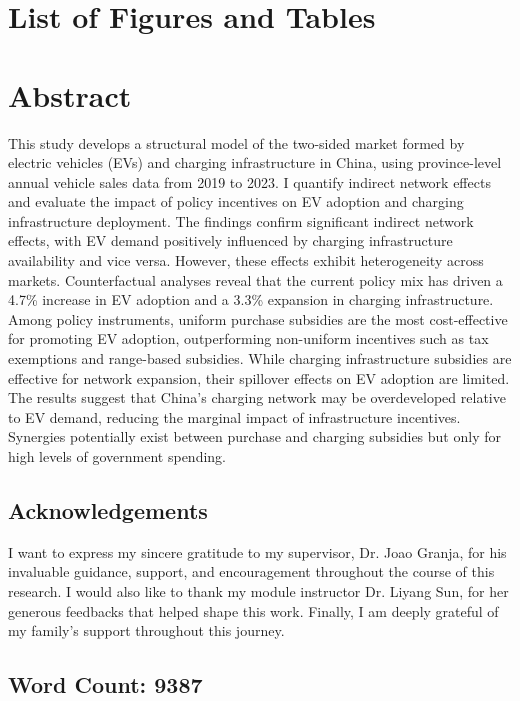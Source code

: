 \documentclass[12pt]{article}
\begin{document}
\section*{List of Figures and Tables}
\listoffigures
\listoftables


\newpage


\section*{Abstract}
This study develops a structural model of the two-sided market formed by electric vehicles (EVs) and charging infrastructure in China, using province-level annual vehicle sales data from 2019 to 2023. 
I quantify indirect network effects and evaluate the impact of policy incentives on EV adoption and charging infrastructure deployment. 
The findings confirm significant indirect network effects, with EV demand positively influenced by charging infrastructure availability and vice versa. 
However, these effects exhibit heterogeneity across markets. Counterfactual analyses reveal that the current policy mix has driven a 4.7\% increase in EV adoption and a 3.3\% expansion in charging infrastructure. 
Among policy instruments, uniform purchase subsidies are the most cost-effective for promoting EV adoption, outperforming non-uniform incentives such as tax exemptions and range-based subsidies. 
While charging infrastructure subsidies are effective for network expansion, their spillover effects on EV adoption are limited. The results suggest that China's charging network may be overdeveloped relative to EV demand, reducing the marginal impact of infrastructure incentives.
Synergies potentially exist between purchase and charging subsidies but only for high levels of government spending.



\subsection*{Acknowledgements}
I want to express my sincere gratitude to my supervisor, Dr. Joao Granja, 
for his invaluable guidance, support, and encouragement throughout the course of this research.
I would also like to thank my module instructor Dr. Liyang Sun, for her generous feedbacks that helped shape this work.
Finally, I am deeply grateful of my family's support throughout this journey.

\subsection*{Word Count: 9387}
\newpage
\end{document}
